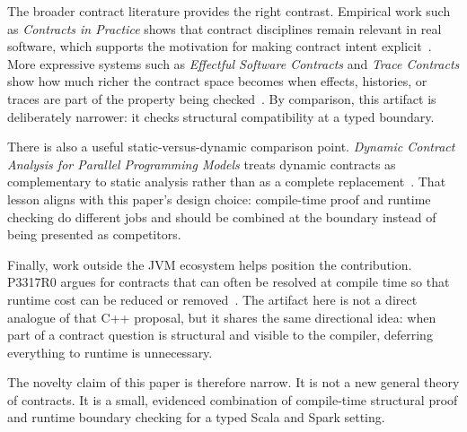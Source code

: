 The broader contract literature provides the right contrast. Empirical work such as \emph{Contracts in Practice} shows that contract disciplines remain relevant in real software, which supports the motivation for making contract intent explicit~\cite{contracts_in_practice}. More expressive systems such as \emph{Effectful Software Contracts} and \emph{Trace Contracts} show how much richer the contract space becomes when effects, histories, or traces are part of the property being checked~\cite{effectful_software_contracts,trace_contracts}. By comparison, this artifact is deliberately narrower: it checks structural compatibility at a typed boundary.

There is also a useful static-versus-dynamic comparison point. \emph{Dynamic Contract Analysis for Parallel Programming Models} treats dynamic contracts as complementary to static analysis rather than as a complete replacement~\cite{dynamic_contract_analysis}. That lesson aligns with this paper's design choice: compile-time proof and runtime checking do different jobs and should be combined at the boundary instead of being presented as competitors.

Finally, work outside the JVM ecosystem helps position the contribution. P3317R0 argues for contracts that can often be resolved at compile time so that runtime cost can be reduced or removed~\cite{compile_time_resolved_contracts}. The artifact here is not a direct analogue of that C++ proposal, but it shares the same directional idea: when part of a contract question is structural and visible to the compiler, deferring everything to runtime is unnecessary.

The novelty claim of this paper is therefore narrow. It is not a new general theory of contracts. It is a small, evidenced combination of compile-time structural proof and runtime boundary checking for a typed Scala and Spark setting.
